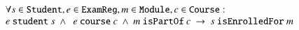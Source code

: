 \documentclass{elsarticle}
\begin{document}
\[\begin{array}{l}\forall s\in\text{\tt Student}, e\in\text{\tt ExamReg}, m\in\text{\tt Module}, c\in\text{\tt Course}:\\
   e\ \text{\tt student}\ s\ \wedge\ \ e\ \text{\tt course}\ c\ \wedge\ m\ \text{\tt isPartOf}\ c\ \rightarrow\ s\ \text{\tt isEnrolledFor}\ m
\end{array}\]
\end{document}
